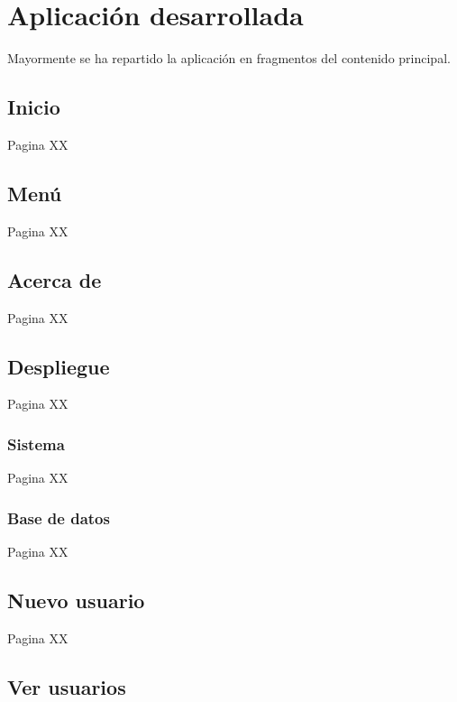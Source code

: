 \documentclass[../PFC.tex]{subfiles}
\begin{document}
\section{Aplicación desarrollada}
\label{App:Aplicación desarrollada}

Mayormente se ha repartido la aplicación en fragmentos del contenido principal.

\subsection{Inicio}
\label{App:AD:Inicio}

Pagina XX

\subsection{Menú}
\label{App:Menu}

Pagina XX

\subsection{Acerca de}
\label{App:AD:Acerca de}

Pagina XX


\subsection{Despliegue}
\label{App:AD:Despliegue}

Pagina XX

\subsubsection{Sistema}
\label{App:AD:D:Sistema}

Pagina XX

\subsubsection{Base de datos}
\label{App:AD:D:Base de dtaos}

Pagina XX

\subsection{Nuevo usuario}
\label{App:AD:Nuevo usuario}

Pagina XX

\subsection{Ver usuarios}
\label{App:AD:Ver usuarios}
\end{document}
